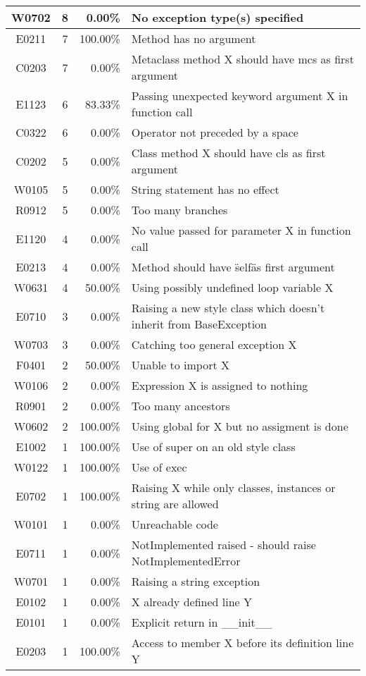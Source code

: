 \documentclass[11pt, a4paper]{article}
\begin{document}
\begin{longtable}{|c|c|r|m{9.2cm}|}
\hline
W0702 & 8 & 0.00\% & No exception type(s) specified \\
\hline
E0211 & 7 & 100.00\% & Method has no argument \\
\hline
C0203 & 7 & 0.00\% & Metaclass method X should have mcs as first argument \\
\hline
E1123 & 6 & 83.33\% & Passing unexpected keyword argument X in function call \\
\hline
C0322 & 6 & 0.00\% & Operator not preceded by a space \\
\hline
C0202 & 5 & 0.00\% & Class method X should have cls as first argument \\
\hline
W0105 & 5 & 0.00\% & String statement has no effect \\
\hline
R0912 & 5 & 0.00\% & Too many branches \\
\hline
E1120 & 4 & 0.00\% & No value passed for parameter X in function call \\
\hline
E0213 & 4 & 0.00\% & Method should have \"self\" as first argument \\
\hline
W0631 & 4 & 50.00\% & Using possibly undefined loop variable X \\
\hline
E0710 & 3 & 0.00\% & Raising a new style class which doesn't inherit from BaseException \\
\hline
W0703 & 3 & 0.00\% & Catching too general exception X \\
\hline
F0401 & 2 & 50.00\% & Unable to import X \\
\hline
W0106 & 2 & 0.00\% & Expression X is assigned to nothing \\
\hline
R0901 & 2 & 0.00\% & Too many ancestors \\
\hline
W0602 & 2 & 100.00\% & Using global for X but no assigment is done \\
\hline
E1002 & 1 & 100.00\% & Use of super on an old style class \\
\hline
W0122 & 1 & 100.00\% & Use of exec \\
\hline
E0702 & 1 & 100.00\% & Raising X while only classes, instances or string are allowed \\
\hline
W0101 & 1 & 0.00\% & Unreachable code \\
\hline
E0711 & 1 & 0.00\% & NotImplemented raised - should raise NotImplementedError \\
\hline
W0701 & 1 & 0.00\% & Raising a string exception \\
\hline
E0102 & 1 & 0.00\% & X already defined line Y \\
\hline
E0101 & 1 & 0.00\% & Explicit return in \_\_init\_\_ \\
\hline
E0203 & 1 & 100.00\% & Access to member X before its definition line Y \\
\hline
\end{longtable}
\end{document}

